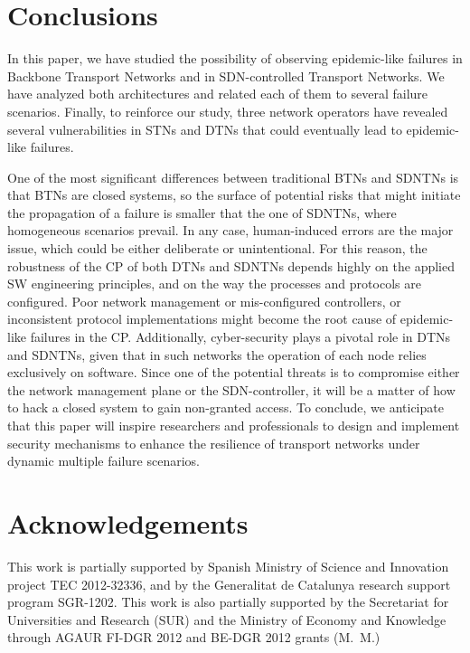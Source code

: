 \documentclass[10pt,draftclsnofoot,onecolumn,journal]{IEEEtran}
\begin{document}
\section{Conclusions\label{sec:conclusions}}
In this paper, we have studied the possibility of observing epidemic-like failures in Backbone Transport Networks and in SDN-controlled Transport Networks. We have analyzed both architectures and related each of them to several failure scenarios. Finally, to reinforce our study, three network operators have revealed several vulnerabilities in STNs and DTNs that could eventually lead to epidemic-like failures.

One of the most significant differences between traditional BTNs and SDNTNs is that BTNs are closed systems, so the surface of potential risks that might initiate the propagation of a failure is smaller that the one of SDNTNs, where homogeneous scenarios prevail. In any case, human-induced errors are the major issue, which could be either deliberate or unintentional. For this reason, the robustness of the CP of both DTNs and SDNTNs depends highly on the applied SW engineering principles, and on the way the processes and protocols are configured. Poor network management or mis-configured controllers, or inconsistent protocol implementations might become the root cause of epidemic-like failures in the CP. Additionally, cyber-security plays a pivotal role in DTNs and SDNTNs, given that in such networks the operation of each node relies exclusively on software. Since one of the potential threats is to compromise either the network management plane or the SDN-controller, it will be a matter of how to hack a closed system to gain non-granted access. To conclude, we anticipate that this paper will inspire researchers and professionals to design and implement security mechanisms to enhance the resilience of transport networks under dynamic multiple failure scenarios.













\section*{Acknowledgements}

This work is partially supported by Spanish Ministry of Science and Innovation project TEC 2012-32336, and by the Generalitat de Catalunya research support program SGR-1202. This work is also partially supported by the Secretariat for Universities and Research (SUR) and the Ministry of Economy and Knowledge through AGAUR FI-DGR 2012 and BE-DGR 2012 grants (M.~M.)



\end{document}
